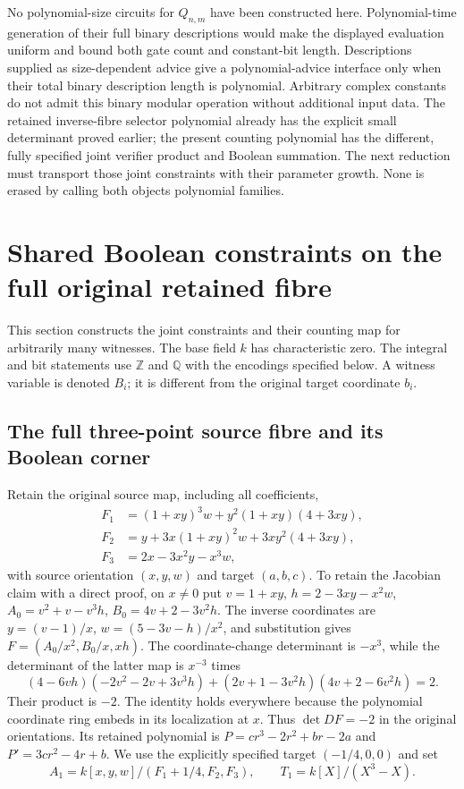 No polynomial-size circuits for $Q_{n,m}$ have been constructed here.
Polynomial-time generation of their full binary descriptions would
make the displayed evaluation uniform and bound both gate count and
constant-bit length. Descriptions supplied as size-dependent advice
give a polynomial-advice interface only when their total binary
description length is polynomial.
Arbitrary complex constants do not admit this binary modular
operation without additional input data.
The retained inverse-fibre selector polynomial already has the
explicit small determinant proved earlier; the present counting
polynomial has the different, fully specified joint verifier product
and Boolean summation. The next reduction must transport those
joint constraints with their parameter growth. None is erased by
calling both objects polynomial families.

\section{Shared Boolean constraints on the full original retained fibre}
\label{sec:sv-shared-verifier}

This section constructs the joint constraints and their counting map for
arbitrarily many witnesses. The base field $k$ has characteristic zero.
The integral and bit statements use $\mathbb Z$ and $\mathbb Q$ with the
encodings specified below. A witness variable is denoted $B_i$; it is
different from the original target coordinate $b_i$.

\subsection{The full three-point source fibre and its Boolean corner}

Retain the original source map, including all coefficients,
\begin{align*}
 F_1&=(1+xy)^3w+y^2(1+xy)(4+3xy),\\
 F_2&=y+3x(1+xy)^2w+3xy^2(4+3xy),\\
 F_3&=2x-3x^2y-x^3w,
\end{align*}
with source orientation $(x,y,w)$ and target $(a,b,c)$.
To retain the Jacobian claim with a direct proof, on $x\ne0$ put
$v=1+xy$, $h=2-3xy-x^2w$,
$A_0=v^2+v-v^3h$, $B_0=4v+2-3v^2h$.
The inverse coordinates are $y=(v-1)/x$, $w=(5-3v-h)/x^2$,
and substitution gives $F=(A_0/x^2,B_0/x,xh)$.
The coordinate-change determinant is $-x^3$, while the determinant
of the latter map is $x^{-3}$ times
\[
 (4-6vh)(-2v^2-2v+3v^3h)
 +(2v+1-3v^2h)(4v+2-6v^2h)=2.
\]
Their product is $-2$. The identity holds everywhere because the
polynomial coordinate ring embeds in its localization at $x$.
Thus $\det DF=-2$ in the original orientations. Its retained polynomial is
$P=cr^3-2r^2+br-2a$ and $P'=3cr^2-4r+b$.
We use the explicitly specified target $(-1/4,0,0)$ and set
\[
 A_1=k[x,y,w]/(F_1+1/4,F_2,F_3),\qquad
 T_1=k[X]/(X^3-X).
\]

